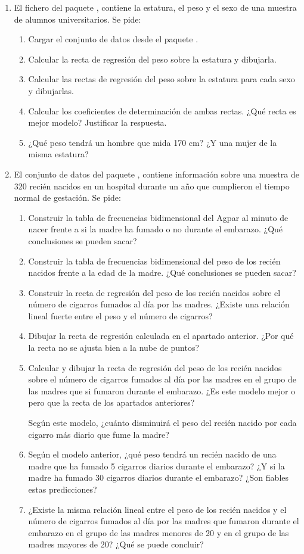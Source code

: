 \begin{enumerate}[leftmargin=*]
\item El fichero  del paquete , contiene la estatura, el peso y
el sexo de una muestra de alumnos universitarios.
Se pide:
\begin{enumerate}
\item Cargar el conjunto de datos  desde el paquete .
\item Calcular la recta de regresión del peso sobre la estatura y dibujarla.
\item Calcular las rectas de regresión del peso sobre la estatura para cada sexo y dibujarlas.
\item Calcular los coeficientes de determinación de ambas rectas. ¿Qué recta es mejor modelo? Justificar la respuesta.
\item ¿Qué peso tendrá un hombre que mida 170 cm? ¿Y una mujer de la misma estatura?
\end{enumerate}

\item El conjunto de datos  del paquete , contiene información sobre una
muestra de 320 recién nacidos en un hospital durante un año que cumplieron el tiempo normal de gestación. 
Se pide:
\begin{enumerate}
\item Construir la tabla de frecuencias bidimensional del Agpar al minuto de nacer frente a si la madre ha fumado o no
durante el embarazo. ¿Qué conclusiones se pueden sacar?
\item Construir la tabla de frecuencias bidimensional del peso de los recién nacidos frente a la edad de la madre. ¿Qué
conclusiones se pueden sacar?
\item Construir la recta de regresión del peso de los recién nacidos sobre el número de cigarros fumados al día por las
madres. ¿Existe una relación lineal fuerte entre el peso y el número de cigarros?
\item Dibujar la recta de regresión calculada en el apartado anterior. ¿Por qué la recta no se ajusta bien a la nube de
puntos?
\item Calcular y dibujar la recta de regresión del peso de los recién nacidos sobre el número de cigarros fumados al día
por las madres en el grupo de las madres que si fumaron durante el embarazo. ¿Es este modelo mejor o pero que la recta
de los apartados anteriores? 

Según este modelo, ¿cuánto disminuirá el peso del recién nacido por cada cigarro más diario
que fume la madre? 
\item Según el modelo anterior, ¿qué peso tendrá un recién nacido de una madre que ha fumado 5 cigarros diarios durante
el embarazo? ¿Y si la madre ha fumado 30 cigarros diarios durante el embarazo? ¿Son fiables estas predicciones?
\item ¿Existe la misma relación lineal entre el peso de los recién nacidos y el número de cigarros fumados al día por
las madres que fumaron durante el embarazo en el grupo de las madres menores de 20 y en el grupo de las madres mayores de
20? ¿Qué se puede concluir?
\end{enumerate}
\end{enumerate}
